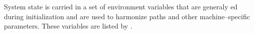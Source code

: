System state is carried in a set of environment variables that are generaly ed during initialization and are used to harmonize paths and other machine--specific parameters. These variables are listed by .
